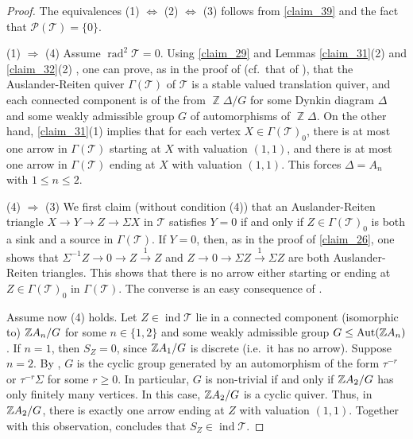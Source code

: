 \documentclass[12pt]{amsart}
\numberwithin{equation}{subsection}
\theoremstyle{plain}
\theoremstyle{definition}
\newcommand{\rad}{\operatorname{rad}}
\newcommand{\Aut}{\operatorname{Aut}\nolimits}
\newcommand{\Proj}{\mathcal{P}}
\newcommand{\ind}{\operatorname{ind}}
\newcommand{\Z}{\operatorname{\mathbb{Z}}\nolimits}
\newcommand{\G}{\Gamma}
\newcommand{\T}{\mathcal{T}}
\newcommand{\ZA}{\Z\hspace{-.6mm}A}
\begin{document}
\begin{proof} 
The equivalences (1) $\Leftrightarrow$ (2) $\Leftrightarrow$ (3) follows from \cref{claim_39} and the fact that $\Proj(\T)=\{0\}$.





(1) $\Rightarrow$ (4)
Assume $\rad^2\T = 0$.
Using \cref{claim_29} and Lemmas \ref{claim_31}(2) and \ref{claim_32}(2) , one can prove, as in the proof of \cite[Theorem 2.3.5]{Xiao-Zhu_2005} (cf.~that of \cite[Theorem 4.1]{Amiot_2007}), that the Auslander-Reiten quiver $\G(\T)$ of $\T$ is a stable valued translation quiver, and each connected component is of the from $\Z\Delta/G$ for some Dynkin diagram $\Delta$ and some weakly admissible group $G$ of automorphisms of $\Z\Delta$.
On the other hand, \cref{claim_31}(1) implies that for each vertex $X \in\G(\T)_0$, there is at most one arrow in $\G(\T)$ starting at $X$ with valuation $(1, 1)$, and there is at most one arrow in $\G(\T)$ ending at $X$ with valuation $(1, 1)$.
This forces $\Delta = A_n$ with $1 \leq n \leq 2$.   






(4) $\Rightarrow$ (3)
We first claim (without condition (4)) that an Auslander-Reiten triangle $X \to Y \to Z \to \Sigma X$ in $\T$ satisfies $Y = 0$ if and only if $Z \in\G(\T)_0$ is both a sink and a source in $\G(\T)$.
If $Y=0$, then, as in the proof of \cref{claim_26}, one shows that $\Sigma^{-1}Z \to 0 \to Z \xrightarrow{1} Z$ and $Z \to 0 \to \Sigma Z \xrightarrow{1} \Sigma Z$ are both Auslander-Reiten triangles.
This shows that there is no arrow either starting or ending at $Z \in\G(\T)_0$ in $\G(\T)$.
The converse is an easy consequence of \cite[Proposition 3.12]{Iyama-Nakaoka-Palu_2024}.




Assume now (4) holds.
Let $Z \in\ind\T$ lie in a connected component (isomorphic to) $\ZA_n/G$ for some $n \in\{1, 2\}$ and some weakly admissible group $G \leq \Aut(\ZA_n)$. 
If $n=1$, then $S_Z=0$, since $\ZA_1/G$ is discrete (i.e.~it has no arrow).
Suppose $n=2$.
By \cite[Theorem 2.1]{Amiot_2007}, $G$ is the cyclic group generated by an automorphism of the form $\tau^{-r}$ or $\tau^{-r}\Sigma$ for some $r\geq 0$. 
In particular, $G$ is non-trivial if and only if $\ZA_2/G$ has only  finitely many vertices.
In this case, $\ZA_2/G$ is a cyclic quiver.
Thus, in $\ZA_2/G$, there is exactly one arrow ending at $Z$ with valuation $(1, 1)$.
Together with this observation, \cite[Proposition 3.12]{Iyama-Nakaoka-Palu_2024} concludes that $S_Z \in \ind\T$.
 \end{proof}
\end{document}
